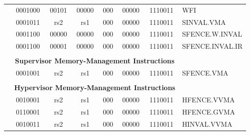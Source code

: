 \begin{table}[p]
\begin{small}
\begin{center}
\begin{tabular}{p{0in}p{0.4in}p{0.05in}p{0.05in}p{0.05in}p{0.05in}p{0.4in}p{0.6in}p{0.4in}p{0.6in}p{0.7in}l}
&
\multicolumn{4}{|c|}{0001000} &
\multicolumn{2}{c|}{00101} &
\multicolumn{1}{c|}{00000} &
\multicolumn{1}{c|}{000} &
\multicolumn{1}{c|}{00000} &
\multicolumn{1}{c|}{1110011} & WFI \\
\cline{2-11}
  

&
\multicolumn{4}{|c|}{0001011} &
\multicolumn{2}{c|}{rs2} &
\multicolumn{1}{c|}{rs1} &
\multicolumn{1}{c|}{000} &
\multicolumn{1}{c|}{00000} &
\multicolumn{1}{c|}{1110011} & SINVAL.VMA \\
\cline{2-11}
  

&
\multicolumn{4}{|c|}{0001100} &
\multicolumn{2}{c|}{00000} &
\multicolumn{1}{c|}{00000} &
\multicolumn{1}{c|}{000} &
\multicolumn{1}{c|}{00000} &
\multicolumn{1}{c|}{1110011} & SFENCE.W.INVAL \\
\cline{2-11}
  

&
\multicolumn{4}{|c|}{0001100} &
\multicolumn{2}{c|}{00001} &
\multicolumn{1}{c|}{00000} &
\multicolumn{1}{c|}{000} &
\multicolumn{1}{c|}{00000} &
\multicolumn{1}{c|}{1110011} & SFENCE.INVAL.IR \\
\cline{2-11}
  

&
\multicolumn{10}{c}{} & \\
&
\multicolumn{10}{c}{\bf Supervisor Memory-Management Instructions} & \\
\cline{2-11}
  

&
\multicolumn{4}{|c|}{0001001} &
\multicolumn{2}{c|}{rs2} &
\multicolumn{1}{c|}{rs1} &
\multicolumn{1}{c|}{000} &
\multicolumn{1}{c|}{00000} &
\multicolumn{1}{c|}{1110011} & SFENCE.VMA \\
\cline{2-11}
  

&
\multicolumn{10}{c}{} & \\
&
\multicolumn{10}{c}{\bf Hypervisor Memory-Management Instructions} & \\
\cline{2-11}
  

&
\multicolumn{4}{|c|}{0010001} &
\multicolumn{2}{c|}{rs2} &
\multicolumn{1}{c|}{rs1} &
\multicolumn{1}{c|}{000} &
\multicolumn{1}{c|}{00000} &
\multicolumn{1}{c|}{1110011} & HFENCE.VVMA \\
\cline{2-11}
  

&
\multicolumn{4}{|c|}{0110001} &
\multicolumn{2}{c|}{rs2} &
\multicolumn{1}{c|}{rs1} &
\multicolumn{1}{c|}{000} &
\multicolumn{1}{c|}{00000} &
\multicolumn{1}{c|}{1110011} & HFENCE.GVMA \\
\cline{2-11}
  

&
\multicolumn{4}{|c|}{0010011} &
\multicolumn{2}{c|}{rs2} &
\multicolumn{1}{c|}{rs1} &
\multicolumn{1}{c|}{000} &
\multicolumn{1}{c|}{00000} &
\multicolumn{1}{c|}{1110011} & HINVAL.VVMA \\
\cline{2-11}
  


\end{tabular}
\end{center}
\end{small}
\end{table}
